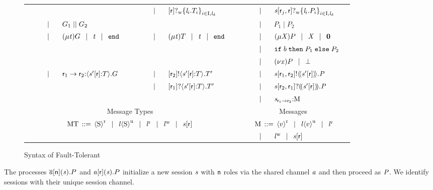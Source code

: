 \begin{figure}[t]
\begin{tabular}{|llclr|llclr|llclr|}
		&&&&& & & $ \sepTerms $ & $ \LBranW{\Role}{\Set{ \Label_i.\LT_i }_{i \in \indexSet, \LabelD}} $ & & & & $ \sepTerms $ & $ \PBranW{\Chan}{\Role_j}{\Role}{\Set{ \Label_i.P_i }_{i \in \indexSet, \LabelD}} $ &\\
		& & $ \sepTerms $ & $ \GPar{\GT_1}{\GT_2} $ & & &&&&& & & $ \sepTerms $ & $ P_1 \mid P_2 $ &\\
		& & $ \sepTerms $ & $ \GRep{\TypeV}{\GT} \sepTerms \TypeV \sepTerms \GEnd $ & & & & $ \sepTerms $ & $ \LRep{\TypeV}{\LT} \sepTerms \TypeV \sepTerms \LEnd $ & & & & $ \sepTerms $ & $ \PRep{\ProcV}{P} \sepTerms \ProcV \sepTerms \PEnd $ &\\
		&&&&& &&&&& & & $ \sepTerms $ & $ \PITE{\Expr[b]}{P_1}{P_2} $ &\\
		&&&&& &&&&& & & $ \sepTerms $ & $ \PRes{\Args}{P} \sepTerms \PCrash $ &\\
		& & \multirow{2}{*}{$ \sepTerms $} & \multirow{2}{*}{$ \GDel{\Role_1}{\Role_2}{\Chan'}{\Role}{\LT}{\GT} $} & & & & $ \sepTerms $ & $ \LDelA{\Role_2}{\Chan'}{\Role}{\LT}{\LT'} $ & & & & $ \sepTerms $ & $ \PDelA{\Chan}{\Role_1}{\Role_2}{\AT{\Chan'}{\Role}}{\PT} $ &\\
		&&&&& & & $ \sepTerms $ & $ \LDelB{\Role_1}{\Chan'}{\Role}{\LT}{\LT'} $ && & & $ \sepTerms $ & $ \PDelB{\Chan}{\Role_2}{\Role_1}{\AT{\Chan'}{\Role}}{\PT} $ &\\
		&&&&& &&&&& & & $ \sepTerms $ & $ \MQ{\Chan}{\Role_1}{\Role_2}{\Queue} $ &\\
		\hline
		\multicolumn{10}{|c|}{Message Types} & \multicolumn{5}{c|}{Messages}\\
		\multicolumn{10}{|c|}{\multirow{2}{*}{$ \MT \deffTerms \MessR{\Sort} \sepTerms \MessU{\Label}{\Sort} \sepTerms \MessBR{\Label} \sepTerms \MessBW{\Label} \sepTerms \AT{\Chan}{\Role} $}} & \multicolumn{5}{c|}{$ \; \Queue \deffTerms \MessR{\Expr[v]} \sepTerms \MessU{\Label}{\Expr[v]} \sepTerms \MessBR{\Label} $}\\
		\multicolumn{10}{|c|}{} &&& $ \sepTerms $ & $ \MessBW{\Label} \sepTerms \AT{\Chan}{\Role} $ &\\
		\hline
	\end{tabular}
	\caption{Syntax of Fault-Tolerant \MPST{}}
	\label{fig:syntax}
\end{figure}

The processes $ \PReq{\Chan[a]}{\Role[n]}{\Chan}{P} $ and $ \PAcc{\Chan[a]}{\Role}{\Chan}{P} $ initialize a new session $ \Chan $ with $ \Role[n] $ roles via the shared channel $ \Chan[a] $ and then proceed as $ \PT $. We identify sessions with their unique session channel.

